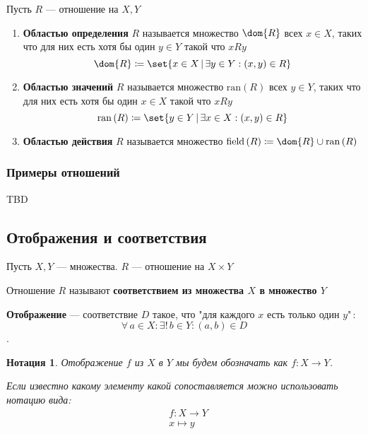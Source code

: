 \documentclass{article}
\newtheorem*{defnotation}{Нотация}
\newcommand{\MapTo}[3]{#1\colon #2 \to #3}
\newcommand{\ran}[1]{\mathrm{ran}\left(#1\right)}
\newcommand{\rfield}[1]{\mathrm{field}\left(#1\right)}
\begin{document}
\begin{definition}
    \label{def:relation-fields}
    Пусть \(R\) --- отношение на \(X, Y\)
    \begin{enumerate}
        \item \textbf{Областью определения} \(R\) называется множество \(\dom{R}\) всех \(x \in X\), таких что для них есть хотя бы один \(y \in Y\) такой что \(x R y\) 
        \[\dom{R} \coloneq \set{x \in X\,|\, \exists y \in Y: (x, y) \in R }\]
        \item \textbf{Областью значений} \(R\) называется множество \(\ran{R}\) всех \(y \in Y\), таких что для них есть хотя бы один \(x \in X\) такой что \(x R y\)  
        \[\ran{R} \coloneq \set{y \in Y\,|\, \exists x \in X: (x, y) \in R }\]
        \item \textbf{Областью действия} \(R\) называется множество \(\rfield{R} \coloneq \dom{R} \cup \ran{R}\)
    \end{enumerate}
\end{definition}
    
\subsubsection{Примеры отношений}
    TBD 


\subsection{Отображения и соответствия}
\begin{definition}  
    \label{def:maps}
    Пусть \(X, Y\) --- множества. \(R\) --- отношение на \(X \times Y\)

    Отношение \(R\) называют \textbf{соответствием из множества \(X\) в множество \(Y\)}
    
    \textbf{Отображение} --- соответствие \(D\) такое, что "для каждого \(x\) есть только один \(y\)"\,: \[\forall\, a \in X: \exists!\, b \in Y: (a, b) \in D\].
\end{definition}
\begin{defnotation}
    Отображение \(f\) из \(X\) в \(Y\) мы будем обозначать как \(\MapTo{f}{X}{Y}\). 
    
    Если известно какому элементу какой сопоставляется можно использовать нотацию вида:
    \begin{align*}
        &\MapTo{f}{X}{Y}\\
        &x \mapsto y
    \end{align*}
\end{defnotation}
\end{document}
